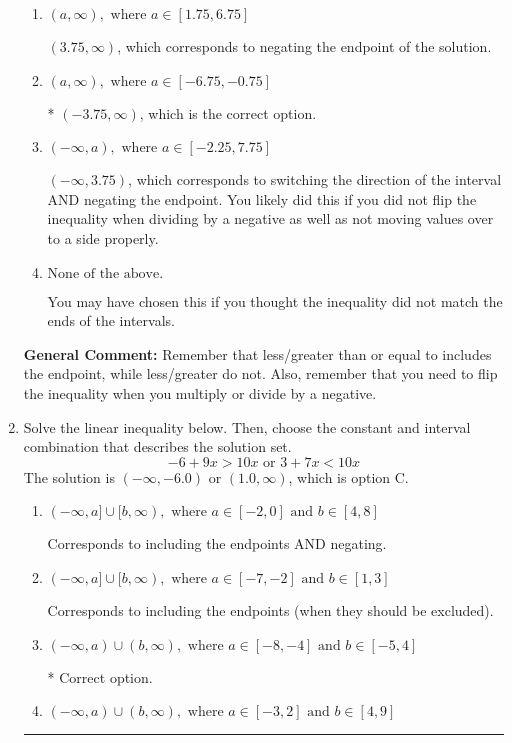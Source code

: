 \documentclass{extbook}[14pt]
\newcommand{\litem}[1]{\item #1

\rule{\textwidth}{0.4pt}}
\begin{document}
\begin{enumerate}
{\begin{enumerate}[label=\Alph*.]
 $(-\infty, -3.75)$, which corresponds to switching the direction of the interval. You likely did this if you did not flip the inequality when dividing by a negative!
\item \( (a, \infty), \text{ where } a \in [1.75, 6.75] \)

 $(3.75, \infty)$, which corresponds to negating the endpoint of the solution.
\item \( (a, \infty), \text{ where } a \in [-6.75, -0.75] \)

* $(-3.75, \infty)$, which is the correct option.
\item \( (-\infty, a), \text{ where } a \in [-2.25, 7.75] \)

 $(-\infty, 3.75)$, which corresponds to switching the direction of the interval AND negating the endpoint. You likely did this if you did not flip the inequality when dividing by a negative as well as not moving values over to a side properly.
\item \( \text{None of the above}. \)

You may have chosen this if you thought the inequality did not match the ends of the intervals.
\end{enumerate}

\textbf{General Comment:} Remember that less/greater than or equal to includes the endpoint, while less/greater do not. Also, remember that you need to flip the inequality when you multiply or divide by a negative.
}
\litem{
Solve the linear inequality below. Then, choose the constant and interval combination that describes the solution set.
\[ -6 + 9 x > 10 x \text{ or } 3 + 7 x < 10 x \]
The solution is \( (-\infty, -6.0) \text{ or } (1.0, \infty) \), which is option C.\begin{enumerate}[label=\Alph*.]
\item \( (-\infty, a] \cup [b, \infty), \text{ where } a \in [-2, 0] \text{ and } b \in [4, 8] \)

Corresponds to including the endpoints AND negating.
\item \( (-\infty, a] \cup [b, \infty), \text{ where } a \in [-7, -2] \text{ and } b \in [1, 3] \)

Corresponds to including the endpoints (when they should be excluded).
\item \( (-\infty, a) \cup (b, \infty), \text{ where } a \in [-8, -4] \text{ and } b \in [-5, 4] \)

 * Correct option.
\item \( (-\infty, a) \cup (b, \infty), \text{ where } a \in [-3, 2] \text{ and } b \in [4, 9] \)


\end{enumerate}}
\end{enumerate}
\end{document}
